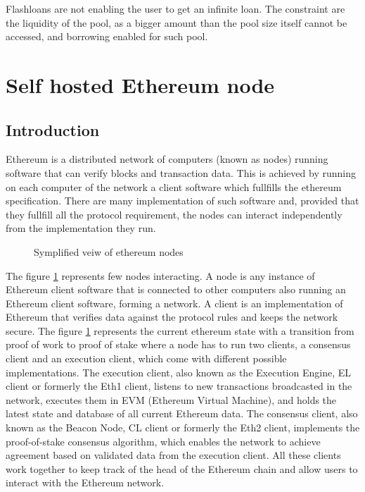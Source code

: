 \documentclass[11pt,a4paper,titlepage]{scrartcl}
\begin{document}
Flashloans  are not enabling the user to get an infinite loan. The constraint are the liquidity of the pool, as a bigger amount than the pool size  itself cannot be accessed, and borrowing enabled for such pool.




\section{Self hosted Ethereum node}
\subsection {Introduction}
Ethereum is a distributed network of computers (known as nodes) running software that can verify blocks and transaction data. This is achieved by running on each computer of the network a client software which fullfills the ethereum specification. There are many implementation of such software and, provided that they fullfill all the protocol requirement, the nodes can interact independently from the  implementation they run. 
\begin{figure}[ht]
    \caption{Symplified veiw of ethereum nodes}
    \label{fig:ethnodes}
\end{figure}

The figure \ref{fig:ethnodes} represents few nodes interacting. A node is any instance of Ethereum client software that is connected to other computers also running an Ethereum client software, forming a network. A client is an implementation of Ethereum that verifies data against the protocol rules and keeps the network secure. The figure \ref{fig:ethnodes} represents the current ethereum  state with a transition  from proof of work to proof of stake where a node has to run two clients, a consensus client and an execution client,  which come with different possible implementations. The execution client, also known as the Execution Engine, EL client or formerly the Eth1 client, listens to new transactions broadcasted in the network, executes them in EVM (Ethereum Virtual Machine), and holds the latest state and database of all current Ethereum data. The consensus client, also known as the Beacon Node, CL client or formerly the Eth2 client, implements the proof-of-stake consensus algorithm, which enables the network to achieve agreement based on validated data from the execution client. All these clients work together to keep track of the head of the Ethereum chain and allow users to interact with the Ethereum network. 
\end{document}
